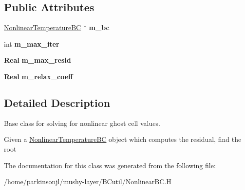 \subsection*{Public Attributes}
\begin{DoxyCompactItemize}
\item 
\mbox{\label{class_nonlinear_b_c_solver_a33f98b75923c002e3a050f3bd625b8f0}} 
\hyperlink{class_nonlinear_temperature_b_c}{Nonlinear\+Temperature\+BC} $\ast$ {\bfseries m\+\_\+bc}
\item 
\mbox{\label{class_nonlinear_b_c_solver_ad2dd12f84f4eebd48fa86f1858eb8f45}} 
int {\bfseries m\+\_\+max\+\_\+iter}
\item 
\mbox{\label{class_nonlinear_b_c_solver_ad2a6f7d7a6629939c4bf6f6dc98149c6}} 
\textbf{ Real} {\bfseries m\+\_\+max\+\_\+resid}
\item 
\mbox{\label{class_nonlinear_b_c_solver_ae66b5b5bb8b88a249172180a9d433ed8}} 
\textbf{ Real} {\bfseries m\+\_\+relax\+\_\+coeff}
\end{DoxyCompactItemize}


\subsection{Detailed Description}
Base class for solving for nonlinear ghost cell values. 

Given a \hyperlink{class_nonlinear_temperature_b_c}{Nonlinear\+Temperature\+BC} object which computes the residual, find the root 

The documentation for this class was generated from the following file\+:\begin{DoxyCompactItemize}
\item 
/home/parkinsonjl/mushy-\/layer/\+B\+Cutil/Nonlinear\+B\+C.\+H\end{DoxyCompactItemize}
